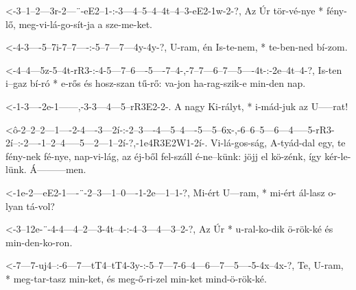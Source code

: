 
  {<-3--1--2---3r-2---¨-eE2--1-:-3---4--5--4--4t--4--3-eE2-1w-2-?,}
  {  Az Úr tör-vé-nye * fény-lő, meg-vi-lá-go-sít-ja a sze-me-ket.}

  {<-4-3----5--7i-7--7----:-5--7---7---4y-4y-?,}
  {  U-ram, én Is-te-nem, * te-ben-ned bí-zom.}

  {<-4--4---5z-5--4t-rR3-:-4-5---7--6----5----7--4-,-7--7---6--7---5----4t-:-2e--4t--4-?,}
  {  Is-ten i--gaz bí-ró * e-rős és hosz-szan tű-rő: va-jon ha-rag-szik-e    min-den nap.}



  {<-1-3----2e-1------,-3-3---4---5--rR3E2-2-.}
  {A nagy Ki-rályt, * i-mád-juk az U-----rat!}


  {<ô-2--2--2---1----2-4----3---2í-:-2--3----4---5--4----5---5--6x-,-6--6--5---6---4-----5-rR3-2í--:-2----1--2--4-----5---2---1--2í-?,-1e4R3E2W1-2í-.}
  {   Vi-lá-gos-ság, A-tyád-dal egy, te fény-nek fé-nye, nap-vi-lág, az éj-ből fel-száll é-ne--künk: jöjj el kö-zénk, így kér-le-lünk. Á---------men.}

  {<-1e-2---eE2-1----¨-2--3---1--0----1-2e---1--1-?,}
  {  Mi-ért U---ram, * mi-ért ál-lasz o-lyan tá-vol?}

  {<-3--12e-¨-4-4---4--2---3-4t--4-:-4--3---4---3--2-?,}
  {  Az Úr  * u-ral-ko-dik ö-rök-ké  és min-den-ko-ron.}

  {<-7---7-uj4--:-6---7---tT4--tT4-3y-:-5--7---7-6--4---6---7---5----5-4x--4x-?,}
  {  Te, U-ram, * meg-tar-tasz min-ket, és meg-ő-ri-zel min-ket mind-ö-rök-ké.}

